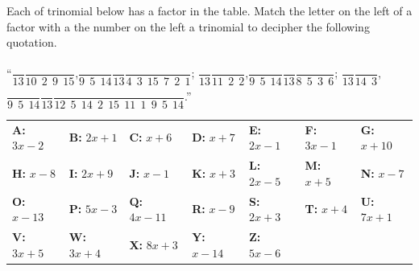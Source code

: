 \documentclass[
  en,11pt]{elegantbook}
\newcommand{\size}[2]{{\fontsize{#1}{0}\selectfont#2}}
\renewenvironment{exercise}[1][]{
    \refstepcounter{exer}
    \par\noindent
    \makebox[-3pt][r]{\color{red!90}\size{12}{\HandPencilLeft}}
	\textbf{\color{main}{\exercisename} \theexer #1}
    \rmfamily
}{\par\ignorespacesafterend}
\begin{document}
\begin{exercise}

Each of trinomial below has a factor in the table. Match the letter on the left of a factor with a the number on the left a trinomial to decipher the following quotation.

``\(\dfrac{\phantom{A}}{13}\)\quad \(\dfrac{\phantom{A}}{10~~2~~9~~15}\),\quad \(\dfrac{\phantom{A}}{9~~5~~14}\)\quad \(\dfrac{\phantom{A}}{13}\)\quad \(\dfrac{\phantom{A}}{4~~3~~15~~7~~2~~1}\);
\phantom{"} \(\dfrac{\phantom{A}}{13}\)\quad \(\dfrac{\phantom{A}}{11~~2~~2}\),\quad \(\dfrac{\phantom{A}}{9~~5~~14}\)\quad \(\dfrac{\phantom{A}}{13}\)\quad \(\dfrac{\phantom{A}}{8~~5~~3~~6}\);
\phantom{"} \(\dfrac{\phantom{A}}{13}\)\quad \(\dfrac{\phantom{A}}{14~~3}\),\quad \(\dfrac{\phantom{A}}{9~~5~~14}\)\quad \(\dfrac{\phantom{A}}{13}\)\quad \(\dfrac{\phantom{A}}{12~~5~~14~~2~~15~~11~~1~~9~~5~~14}\).''

\begin{longtable}[]{@{}
  >{\raggedright\arraybackslash}p{}
  >{\raggedright\arraybackslash}p{}
  >{\raggedright\arraybackslash}p{}
  >{\raggedright\arraybackslash}p{}
  >{\raggedright\arraybackslash}p{}
  >{\raggedright\arraybackslash}p{}
  >{\raggedright\arraybackslash}p{}@{}}
\toprule\noalign{}
\endhead
\bottomrule\noalign{}
\endlastfoot
\textbf{A:} \(3x-2\) & \textbf{B:} \(2x+1\) & \textbf{C:} \(x+6\) & \textbf{D:} \(x+7\) & \textbf{E:} \(2x-1\) & \textbf{F:} \(3x-1\) & \textbf{G:} \(x+10\) \\
\textbf{H:} \(x-8\) & \textbf{I:} \(2x+9\) & \textbf{J:} \(x-1\) & \textbf{K:} \(x+3\) & \textbf{L:} \(2x-5\) & \textbf{M:} \(x+5\) & \textbf{N:} \(x-7\) \\
\textbf{O:} \(x-13\) & \textbf{P:} \(5x-3\) & \textbf{Q:} \(4x-11\) & \textbf{R:} \(x-9\) & \textbf{S:} \(2x+3\) & \textbf{T:} \(x+4\) & \textbf{U:} \(7x+1\) \\
\textbf{V:} \(3x+5\) & \textbf{W:} \(3x+4\) & \textbf{X:} \(8x+3\) & \textbf{Y:} \(x-14\) & \textbf{Z:} \(5x-6\) & & \\
\end{longtable}

\end{exercise}
\end{document}
